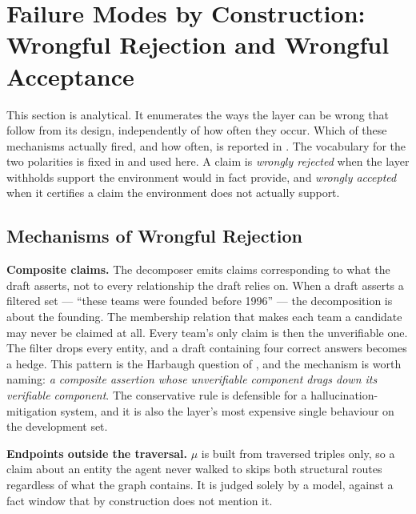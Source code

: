 \section{Failure Modes by Construction: Wrongful Rejection and Wrongful
Acceptance}\label{sec:verify-failure-modes}

This section is analytical. It enumerates the ways the layer can be wrong that
follow from its design, independently of how often they occur. Which of these
mechanisms actually fired, and how often, is reported in
. The vocabulary for the two polarities is fixed in
 and used here. A claim is \emph{wrongly rejected} when the
layer withholds support the environment would in fact provide, and \emph{wrongly
accepted} when it certifies a claim the environment does not actually support.

\subsection*{Mechanisms of Wrongful Rejection}

\textbf{Composite claims.} The decomposer emits claims corresponding to what the
draft asserts, not to every relationship the draft relies on. When a draft
asserts a filtered set --- ``these teams were founded before 1996'' --- the
decomposition is about the founding. The membership relation that makes each
team a candidate may never be claimed at all. Every team's only claim is then
the unverifiable one. The filter drops every entity, and a draft containing
four correct answers becomes a hedge. This pattern is the Harbaugh question of
, and the mechanism is worth naming: \emph{a composite
assertion whose unverifiable component drags down its verifiable component}. The
conservative rule is defensible for a hallucination-mitigation system, and it is
also the layer's most expensive single behaviour on the development set.

\textbf{Endpoints outside the traversal.} $\mu$ is built from traversed triples
only, so a claim about an entity the agent never walked to skips both structural
routes regardless of what the graph contains. It is judged solely by a model,
against a fact window that by construction does not mention it.

